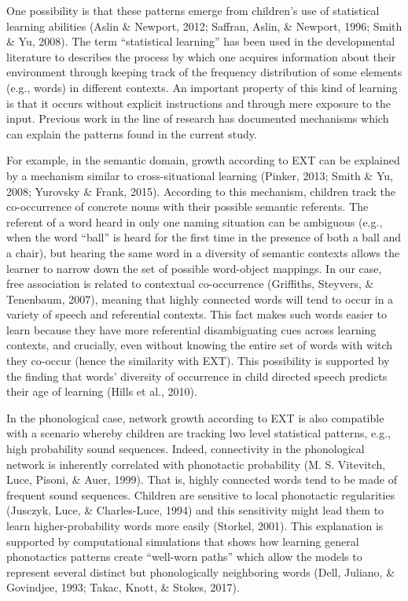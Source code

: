 \documentclass[english,floatsintext,man]{apa6}
\theoremstyle{definition}
\theoremstyle{definition}
\theoremstyle{definition}
\theoremstyle{remark}
\begin{document}
One possibility is that these patterns emerge from children's use of
statistical learning abilities (Aslin \& Newport, 2012; Saffran, Aslin,
\& Newport, 1996; Smith \& Yu, 2008). The term \enquote{statistical
learning} has been used in the developmental literature to describes the
process by which one acquires information about their environment
through keeping track of the frequency distribution of some elements
(e.g., words) in different contexts. An important property of this kind
of learning is that it occurs without explicit instructions and through
mere exposure to the input. Previous work in the line of research has
documented mechanisms which can explain the patterns found in the
current study.

For example, in the semantic domain, growth according to EXT can be
explained by a mechanism similar to cross-situational learning (Pinker,
2013; Smith \& Yu, 2008; Yurovsky \& Frank, 2015). According to this
mechanism, children track the co-occurrence of concrete nouns with their
possible semantic referents. The referent of a word heard in only one
naming situation can be ambiguous (e.g., when the word \enquote{ball} is
heard for the first time in the presence of both a ball and a chair),
but hearing the same word in a diversity of semantic contexts allows the
learner to narrow down the set of possible word-object mappings. In our
case, free association is related to contextual co-occurrence
(Griffiths, Steyvers, \& Tenenbaum, 2007), meaning that highly connected
words will tend to occur in a variety of speech and referential
contexts. This fact makes such words easier to learn because they have
more referential disambiguating cues across learning contexts, and
crucially, even without knowing the entire set of words with witch they
co-occur (hence the similarity with EXT). This possibility is supported
by the finding that words' diversity of occurrence in child directed
speech predicts their age of learning (Hills et al., 2010).

In the phonological case, network growth according to EXT is also
compatible with a scenario whereby children are tracking lwo level
statistical patterns, e.g., high probability sound sequences. Indeed,
connectivity in the phonological network is inherently correlated with
phonotactic probability (M. S. Vitevitch, Luce, Pisoni, \& Auer, 1999).
That is, highly connected words tend to be made of frequent sound
sequences. Children are sensitive to local phonotactic regularities
(Jusczyk, Luce, \& Charles-Luce, 1994) and this sensitivity might lead
them to learn higher-probability words more easily (Storkel, 2001). This
explanation is supported by computational simulations that shows how
learning general phonotactics patterns create ``well-worn paths'' which
allow the models to represent several distinct but phonologically
neighboring words (Dell, Juliano, \& Govindjee, 1993; Takac, Knott, \&
Stokes, 2017).
\end{document}
